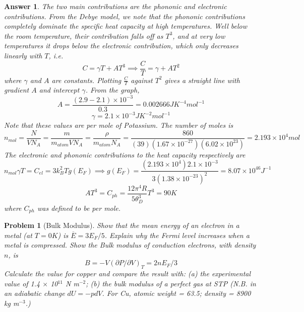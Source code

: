 \documentclass[a4paper]{article}
\newtheorem{ans}{Answer}[section]
\theoremstyle{new}
\newtheorem{qns}{Problem}[section]
\begin{document}
\begin{ans}
The two main contributions are the phononic and electronic contributions. From the Debye model, we note that the phononic contributions completely dominate the specific heat capacity at high temperatures. Well below the room temperature, their contribution falls off as $T^3$, and at very low temperatures it drops below the electronic contribution, which only decreases linearly with $T$, i.e. 
$$C=\gamma T+AT^3\implies\frac{C}{T}=\gamma+AT^2$$
where $\gamma$ and $A$ are constants. Plotting $\frac{C}{T}$ against $T^2$ gives a straight line with gradient $A$ and intercept $\gamma$. From the graph,
$$A=\frac{(2.9-2.1)\times10^{-3}}{0.3}=0.002666JK^{-4}mol^{-1}$$
$$\gamma=2.1\times10^{-3}JK^{-2}mol^{-1}$$
Note that these values are per mole of Potassium. The number of moles is
$$n_{mol}=\frac{N}{VN_A}=\frac{m}{m_{atom}VN_A}=\frac{\rho}{m_{atom}N_A}=\frac{860}{(39)(1.67\times10^{-27})(6.02\times10^{23})}=2.193\times10^4mol$$
The electronic and phononic contributions to the heat capacity respectively are
$$n_{mol}\gamma T=C_{el}=3k_B^2Tg(E_F)\implies g(E_F)=\frac{(2.193\times10^4)2.1\times10^{-3}}{3(1.38\times10^{-23})^2}=8.07\times10^{46}J^{-1}$$
$$AT^3=C_{ph}=\frac{12\pi^4R}{5\theta_D^3}T^3=90K$$
where $C_{ph}$ was defined to be per mole.
\end{ans}
\newpage
\begin{qns}[Bulk Modulus]
Show that the mean energy of an electron in a metal (at $T=0 K$) is $\overline{E}=3E_F/5$. Explain why the Fermi level increases when a metal is compressed. Show the Bulk modulus of conduction electrons, with density $n$, is
$$B=-V(\partial P/\partial V)_T=2nE_F/3$$
Calculate the value for copper and compare the result with: (a) the experimental value of 1.4 $\times$ 10$^{11}$ N m$^{-2}$; (b) the bulk modulus of a perfect gas at STP (N.B. in an adiabatic change $dU = -pdV$. For Cu, atomic weight = 63.5; density = 8900 kg m$^{-3}$.)
\end{qns}
\end{document}
